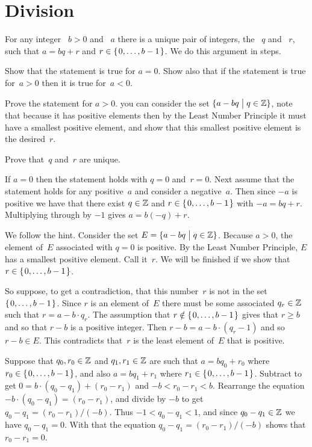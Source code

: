 \documentclass{ibl}  %
\begin{document}
\section{Division}
\begin{ex}  For any integer 
~$b>0$ and ~$a$ there is a unique pair of
integers, the ~$q$ and ~$r$,
such that $a=bq+r$ and $r\in\mbox{$\{\hspace{0.1em}0,\ldots,b-1\hspace{0.1em}\}$}$.
We do this argument in steps.
\begin{exes} 
\item Show that the statement is true for $a=0$.
  Show also that if the statement is true for~$a>0$ then it is true
  for~$a<0$. 
\item Prove the statement for $a>0$.
  \hint you can consider the set $\{a-bq \bigm| q\in\mathbb{Z}\}$,
  note that
  because it has positive elements then by the Least Number Principle
  it must have a smallest positive
  element, and show that this smallest positive element is the desired~$r$.
\item
  Prove that~$q$ and~$r$ are unique.
\end{exes}
\begin{ans}
\begin{exes}
\item
  If $a=0$ then the statement holds with $q=0$ and~$r=0$.
  Next assume that the statement holds for any positive~$a$ 
  and consider a negative~$a$.
  Then since $-a$ is positive we have that there exist 
  $q\in\mathbb{Z}$ and $r\in\mbox{$\{\hspace{0.1em}0,\ldots,b-1\hspace{0.1em}\}$}$ with $-a=bq+r$.
  Multiplying through by $-1$ gives $a=b(-q)+r$.
\item We follow the hint.
  Consider the set $E=\{a-bq \bigm| q\in\mathbb{Z}\}$.
  Because $a>0$, the element of~$E$ associated with $q=0$ is positive.
  By the Least Number Principle, $E$ has a smallest positive element.
  Call it~$r$.
  We will be finished if we show that~$r\in\mbox{$\{\hspace{0.1em}0, \ldots , b-1\hspace{0.1em}\}$}$.

  So suppose, to get a contradiction, that this number~$r$ is not in the set 
  $\mbox{$\{\hspace{0.1em}0, \ldots , b-1\hspace{0.1em}\}$}$.
  Since $r$ is an element of~$E$ there must be some associated
  $q_r\in\mathbb{Z}$ such that $r=a-b\cdot q_r$.
  The assumption that $r\notin\mbox{$\{\hspace{0.1em}0, \ldots , b-1\hspace{0.1em}\}$}$ gives that $r\geq b$
  and so that $r-b$ is a positive integer.
  Then $r-b=a-b\cdot (q_r-1)$ and so $r-b\in E$.
  This contradicts that~$r$ is the least element of~$E$ that is positive.
\item Suppose that $q_0,r_0\in\mathbb{Z}$ and $q_1,r_1\in\mathbb{Z}$ are such that
  $a=bq_0+r_0$ where $r_0\in\mbox{$\{\hspace{0.1em}0, \ldots, b-1\hspace{0.1em}\}$}$, and also
  $a=bq_1+r_1$ where $r_1\in\mbox{$\{\hspace{0.1em}0, \ldots, b-1\hspace{0.1em}\}$}$.
  Subtract to get $0=b\cdot(q_0-q_1)+(r_0-r_1)$ and $-b<r_0-r_1<b$.
  Rearrange the equation $-b\cdot(q_0-q_1)=(r_0-r_1)$,
  and divide by $-b$ to get $q_0-q_1=(r_0-r_1)/(-b)$.
  Thus  $-1<q_0-q_1<1$, and since $q_0-q_1\in\mathbb{Z}$ we have $q_0-q_1=0$.
  With that the equation $q_0-q_1=(r_0-r_1)/(-b)$ shows that $r_0-r_1=0$.
\end{exes}
\end{ans}
\end{ex}
\end{document}
